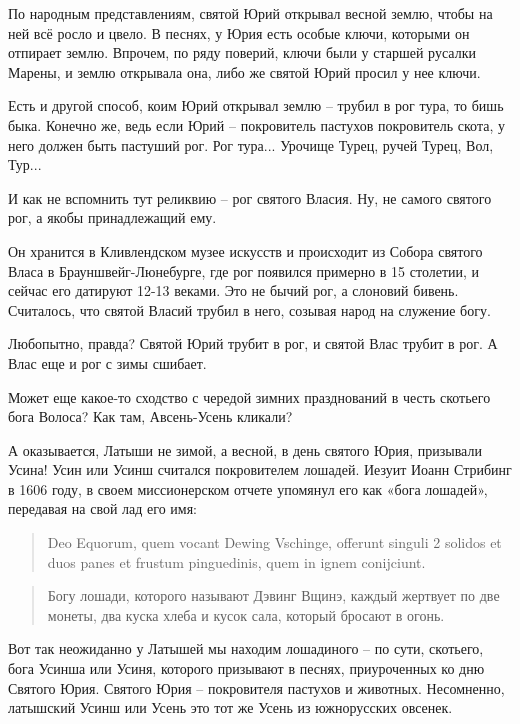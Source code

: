    По народным представлениям, святой Юрий открывал весной землю, чтобы на ней всё росло и цвело. В песнях, у Юрия есть особые ключи, которыми он отпирает землю. Впрочем, по ряду поверий, ключи были у старшей русалки Марены, и землю открывала она, либо же святой Юрий просил у нее ключи.

   Есть и другой способ, коим Юрий открывал землю – трубил в рог тура, то бишь быка. Конечно же, ведь если Юрий – покровитель пастухов покровитель скота, у него должен быть пастуший рог. Рог тура... Урочище Турец, ручей Турец, Вол, Тур...

   И как не вспомнить тут реликвию – рог святого Власия. Ну, не самого святого рог, а якобы принадлежащий ему.

   
   Он хранится в Кливлендском музее искусств и происходит из Собора святого Власа в Брауншвейг-Люнебурге, где рог появился примерно в 15 столетии, и сейчас его датируют 12-13 веками. Это не бычий рог, а слоновий бивень. Считалось, что святой Власий трубил в него, созывая народ на служение богу.

   Любопытно, правда? Святой Юрий трубит в рог, и святой Влас трубит в рог. А Влас еще и рог с зимы сшибает.

   Может еще какое-то сходство с чередой зимних празднований в честь скотьего бога Волоса? Как там, Авсень-Усень кликали?

   А оказывается, Латыши не зимой, а весной, в день святого Юрия, призывали Усина! Усин или Усинш считался покровителем лошадей. Иезуит Иоанн Стрибинг в 1606 году, в своем миссионерском отчете упомянул его как «бога лошадей», передавая на свой лад его имя:

\begin{quotation}
Deo Equorum, quem vocant Dewing Vschinge, offerunt singuli 2 solidos et duos panes et frustum pinguedinis, quem in ignem conijciunt.\end{quotation}

\begin{quotation}
Богу лошади, которого называют Дэвинг Вщинэ, каждый жертвует по две монеты, два куска хлеба и кусок сала, который бросают в огонь.
\end{quotation}


   Вот так неожиданно у Латышей мы находим лошадиного – по сути, скотьего, бога Усинша или Усиня, которого призывают в песнях, приуроченных ко дню Святого Юрия. Святого Юрия – покровителя пастухов и животных. Несомненно, латышский Усинш или Усень это тот же Усень из южнорусских овсенек.

